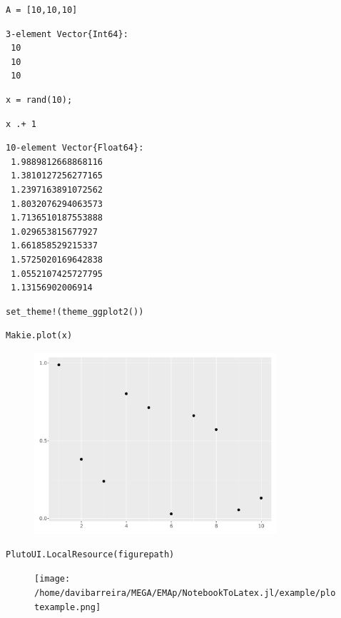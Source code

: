 \begin{lstlisting}[language=JuliaLocal, style=julia]
A = [10,10,10]
\end{lstlisting}

\begin{verbatim}
3-element Vector{Int64}:
 10
 10
 10
\end{verbatim}

\begin{lstlisting}[language=JuliaLocal, style=julia]
x = rand(10);
\end{lstlisting}

\begin{lstlisting}[language=JuliaLocal, style=julia]
x .+ 1
\end{lstlisting}

\begin{verbatim}
10-element Vector{Float64}:
 1.9889812668868116
 1.3810127256277165
 1.2397163891072562
 1.8032076294063573
 1.7136510187553888
 1.029653815677927
 1.661858529215337
 1.5725020169642838
 1.0552107425727795
 1.13156902006914
\end{verbatim}

\begin{lstlisting}[language=JuliaLocal, style=julia]
set_theme!(theme_ggplot2())
\end{lstlisting}

\begin{lstlisting}[language=JuliaLocal, style=julia]
Makie.plot(x)
\end{lstlisting}

\begin{figure}[H]
	\centering
	\includegraphics[width=0.8\textwidth]{./figures/examplepluto_figure2.pdf}
	\label{fig:examplepluto_figure2.pdf}

\end{figure}

\begin{lstlisting}[language=JuliaLocal, style=julia]
PlutoUI.LocalResource(figurepath)
\end{lstlisting}

\begin{figure}[H]
	\centering
	\texttt{[image: /home/davibarreira/MEGA/EMAp/NotebookToLatex.jl/example/plotexample.png]}
	\label{fig:/home/davibarreira/MEGA/EMAp/NotebookToLatex.jl/example/plotexample.png}

\end{figure}
